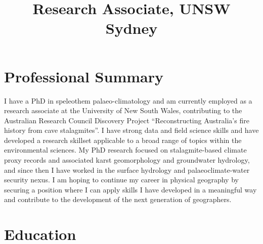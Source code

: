 \documentclass[11pt,a4paper,]{moderncv}
\title{Research Associate, UNSW Sydney}
\begin{document}
\makecvtitle



\hypertarget{professional-summary}{%
\section{Professional Summary}\label{professional-summary}}

I have a PhD in speleothem palaeo-climatology and am currently employed
as a research associate at the University of New South Wales,
contributing to the Australian Research Council Discovery Project
``Reconstructing Australia's fire history from cave stalagmites''. I
have strong data and field science skills and have developed a research
skillset applicable to a broad range of topics within the environmental
sciences. My PhD research focused on stalagmite-based climate proxy
records and associated karst geomorphology and groundwater hydrology,
and since then I have worked in the surface hydrology and
palaeoclimate-water security nexus. I am hoping to continue my career in
physical geography by securing a position where I can apply skills I
have developed in a meaningful way and contribute to the development of
the next generation of geographers.

\hypertarget{education}{%
\section{Education}\label{education}}

\nopagebreak
    \nopagebreak
\end{document}
